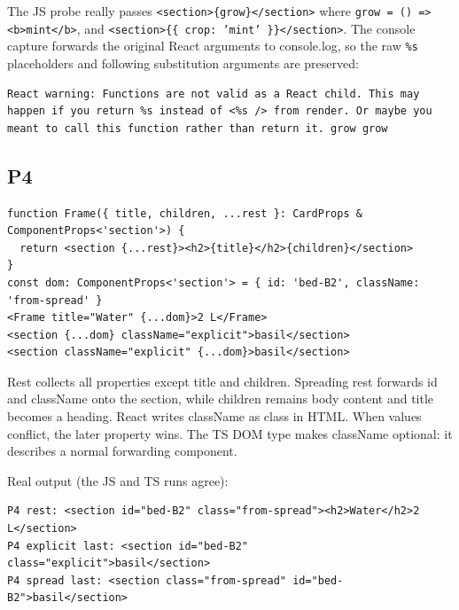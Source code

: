 \documentclass[
  10pt,
  a4paper,
]{article}
\begin{document}
The JS probe really passes
\texttt{\textless{}\allowbreak{}section\textgreater{}\allowbreak{}\{grow\}\textless{}\allowbreak{}/\allowbreak{}section\textgreater{}\allowbreak{}}
where
\texttt{grow =\allowbreak{} () =\allowbreak{}\textgreater{}\allowbreak{} \textless{}\allowbreak{}b\textgreater{}\allowbreak{}mint\textless{}\allowbreak{}/\allowbreak{}b\textgreater{}\allowbreak{}},
and
\texttt{\textless{}\allowbreak{}section\textgreater{}\allowbreak{}\{\{ crop:\allowbreak{} 'mint' \}\}\textless{}\allowbreak{}/\allowbreak{}section\textgreater{}\allowbreak{}}.
The console capture forwards the original React arguments to
console.log, so the raw \texttt{\%s} placeholders and following
substitution arguments are preserved:

\begin{lstlisting}
React warning: Functions are not valid as a React child. This may happen if you return %s instead of <%s /> from render. Or maybe you meant to call this function rather than return it. grow grow
\end{lstlisting}

\subsection{P4}\label{p4}

\begin{lstlisting}
function Frame({ title, children, ...rest }: CardProps & ComponentProps<'section'>) {
  return <section {...rest}><h2>{title}</h2>{children}</section>
}
const dom: ComponentProps<'section'> = { id: 'bed-B2', className: 'from-spread' }
<Frame title="Water" {...dom}>2 L</Frame>
<section {...dom} className="explicit">basil</section>
<section className="explicit" {...dom}>basil</section>
\end{lstlisting}

Rest collects all properties except title and children. Spreading rest
forwards id and className onto the section, while children remains body
content and title becomes a heading. React writes className as class in
HTML. When values conflict, the later property wins. The TS DOM type
makes className optional: it describes a normal forwarding component.

Real output (the JS and TS runs agree):

\begin{lstlisting}
P4 rest: <section id="bed-B2" class="from-spread"><h2>Water</h2>2 L</section>
P4 explicit last: <section id="bed-B2" class="explicit">basil</section>
P4 spread last: <section class="from-spread" id="bed-B2">basil</section>
\end{lstlisting}
\end{document}
